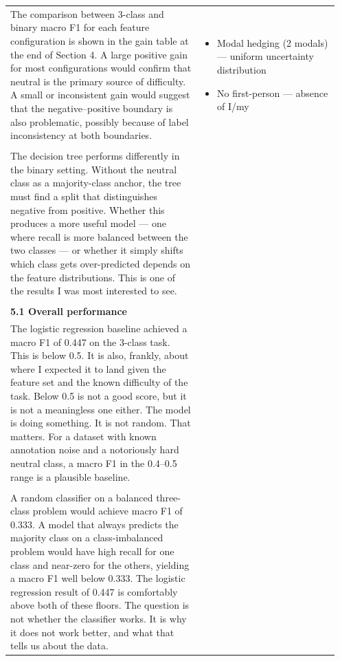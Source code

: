 \documentclass[11pt]{article}
\begin{document}
\begin{longtable}{|p{0.55\linewidth}|p{0.40\linewidth}|}
\rule{0pt}{3.5cm} & \\
\hline
The comparison between 3-class and binary macro F1 for each feature configuration is shown in the gain table at the end of Section 4. A large positive gain for most configurations would confirm that neutral is the primary source of difficulty. A small or inconsistent gain would suggest that the negative--positive boundary is also problematic, possibly because of label inconsistency at both boundaries. & \begin{itemize}[leftmargin=1em,itemsep=1pt,topsep=1pt,parsep=0pt]
  \item Modal hedging (2 modals) --- uniform uncertainty distribution
  \item No first-person --- absence of I/my
\end{itemize} \\[2pt]
\hline
\rule{0pt}{3.5cm} & \\
\hline
The decision tree performs differently in the binary setting. Without the neutral class as a majority-class anchor, the tree must find a split that distinguishes negative from positive. Whether this produces a more useful model --- one where recall is more balanced between the two classes --- or whether it simply shifts which class gets over-predicted depends on the feature distributions. This is one of the results I was most interested to see. &  \\[2pt]
\hline
\rule{0pt}{3.5cm} & \\
\hline
\textbf{5.1 Overall performance}\\[4pt]
The logistic regression baseline achieved a macro F1 of 0.447 on the 3-class task. This is below 0.5. It is also, frankly, about where I expected it to land given the feature set and the known difficulty of the task. Below 0.5 is not a good score, but it is not a meaningless one either. The model is doing something. It is not random. That matters. For a dataset with known annotation noise and a notoriously hard neutral class, a macro F1 in the 0.4--0.5 range is a plausible baseline. &  \\[2pt]
\hline
\rule{0pt}{3.5cm} & \\
\hline
A random classifier on a balanced three-class problem would achieve macro F1 of 0.333. A model that always predicts the majority class on a class-imbalanced problem would have high recall for one class and near-zero for the others, yielding a macro F1 well below 0.333. The logistic regression result of 0.447 is comfortably above both of these floors. The question is not whether the classifier works. It is why it does not work better, and what that tells us about the data. & \begin{itemize}[leftmargin=1em,itemsep=1pt,topsep=1pt,parsep=0pt]

\end{itemize}
\end{longtable}
\end{document}
